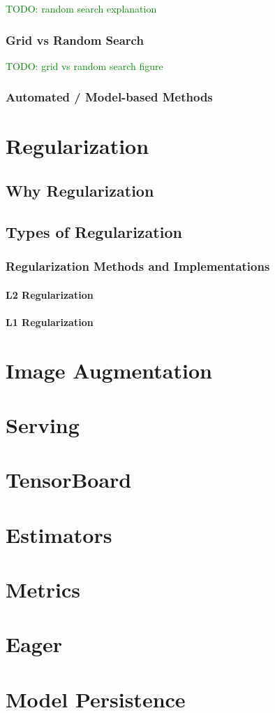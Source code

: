 \textcolor{green}{TODO: random search explanation}

\subsubsection{Grid vs Random Search}

\textcolor{green}{TODO: grid vs random search figure}

\subsubsection{Automated / Model-based Methods}


\section{Regularization}

\subsection{Why Regularization}

\subsection{Types of Regularization}

\subsubsection{Regularization Methods and Implementations}

\paragraph{L2 Regularization}

\paragraph{L1 Regularization}

\section{Image Augmentation}

\section{Serving}

\section{TensorBoard}

\section{Estimators}

\section{Metrics}

\section{Eager}

\section{Model Persistence}

